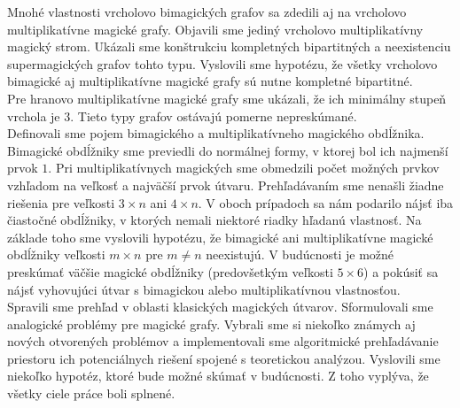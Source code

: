 Mnohé vlastnosti vrcholovo bimagických grafov sa zdedili aj na vrcholovo multiplikatívne magické grafy. Objavili sme jediný vrcholovo multiplikatívny magický strom. Ukázali sme konštrukciu kompletných bipartitných a neexistenciu supermagických grafov tohto typu. Vyslovili sme hypotézu, že všetky vrcholovo bimagické aj multiplikatívne magické grafy sú nutne kompletné bipartitné. \\

Pre hranovo multiplikatívne magické grafy sme ukázali, že ich minimálny stupeň vrchola je $3$. Tieto typy grafov ostávajú pomerne nepreskúmané. \\

Definovali sme pojem bimagického a multiplikatívneho magického obdĺžnika. Bimagické obdĺžniky sme previedli do normálnej formy, v ktorej bol ich najmenší prvok $1$. Pri multiplikatívnych magických sme obmedzili počet možných prvkov vzhľadom na veľkosť a najväčší prvok útvaru. Prehľadávaním sme nenašli žiadne riešenia pre veľkosti $3 \times n$ ani $4 \times n$. V oboch prípadoch sa nám podarilo nájsť iba čiastočné obdĺžniky, v ktorých nemali niektoré riadky hľadanú vlastnosť. Na základe toho sme vyslovili hypotézu, že bimagické ani multiplikatívne magické obdĺžniky veľkosti $m \times n$ pre $m \neq n$ neexistujú. V budúcnosti je možné preskúmať väčšie magické obdĺžniky (predovšetkým veľkosti $5 \times 6$) a pokúsiť sa nájsť vyhovujúci útvar s bimagickou alebo multiplikatívnou vlastnosťou. \\

Spravili sme prehľad v oblasti klasických magických útvarov. Sformulovali sme analogické problémy pre magické grafy. Vybrali sme si niekoľko známych aj nových otvorených problémov a implementovali sme algoritmické prehľadávanie priestoru ich potenciálnych riešení spojené s teoretickou analýzou. Vyslovili sme niekoľko hypotéz, ktoré bude možné skúmať v budúcnosti. Z toho vyplýva, že všetky ciele práce boli splnené.